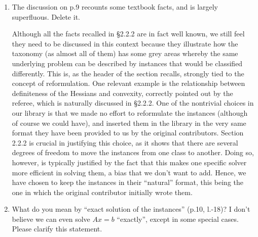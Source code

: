 \documentclass[11pt]{article}
\newcommand{\rep}[1]{{\textcolor{acblue}{#1}}}
\newcommand{\leo}[1]{{\color{red}#1}}
\begin{document}
{\begin{enumerate}
can be solved to global optimality as long as the matrix is second-order sufficient. This means
that even some QPs with indefinite Hessians can easily be solved to global optimality.

\rep{Thank you for having raised this point. We addressed in Sections 2.2.1 and 2.2.2.
%
}


\item The discussion on p.9 recounts some textbook facts, and is largely superfluous. Delete it.

\rep{
Although all the facts recalled in \S 2.2.2 are in fact well known, we still feel they need to be discussed in this context because they illustrate how the taxonomy (as almost all of them) has some grey areas whereby the same underlying problem can be described by instances that would be classified differently. This is, as the header of the section recalls, strongly tied to the concept of reformulation. One relevant example is the relationship between definiteness of the Hessians and convexity, correctly pointed out by the referee, which is naturally discussed in \S 2.2.2. One of the nontrivial choices in our library is that we made no effort to reformulate the instances (although of course we could have), and inserted them in the library in the very same format they have been provided to us by the original contributors. Section 2.2.2 is crucial in justifying this choice, as it shows that there are several degrees of freedom to move the instances from one class to another. Doing so, however, is typically justified by the fact that this makes one specific solver more efficient in solving them, a bias that we don't want to add. Hence, we have chosen to keep the instances in their ``natural'' format, this being the one in which the original contributor initially wrote them.
}


\item What do you mean by ``exact solution of the instances'' (p.10, l.-18)? I don't believe we can even
solve $Ax = b$ ``exactly'', except in some special cases. Please clarify this statement.


\end{enumerate}}
\end{document}
